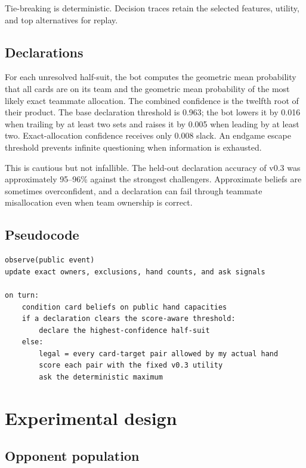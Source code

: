 \documentclass[11pt]{article}
\begin{document}
Tie-breaking is deterministic. Decision traces retain the selected features, utility, and top alternatives for replay.

\subsection{Declarations}

For each unresolved half-suit, the bot computes the geometric mean probability that all cards are on its team and the geometric mean probability of the most likely exact teammate allocation. The combined confidence is the twelfth root of their product. The base declaration threshold is 0.963; the bot lowers it by 0.016 when trailing by at least two sets and raises it by 0.005 when leading by at least two. Exact-allocation confidence receives only 0.008 slack. An endgame escape threshold prevents infinite questioning when information is exhausted.

This is cautious but not infallible. The held-out declaration accuracy of v0.3 was approximately 95--96\% against the strongest challengers. Approximate beliefs are sometimes overconfident, and a declaration can fail through teammate misallocation even when team ownership is correct.

\subsection{Pseudocode}

\begin{verbatim}
observe(public event)
update exact owners, exclusions, hand counts, and ask signals

on turn:
    condition card beliefs on public hand capacities
    if a declaration clears the score-aware threshold:
        declare the highest-confidence half-suit
    else:
        legal = every card-target pair allowed by my actual hand
        score each pair with the fixed v0.3 utility
        ask the deterministic maximum
\end{verbatim}

\section{Experimental design}

\subsection{Opponent population}
\end{document}
